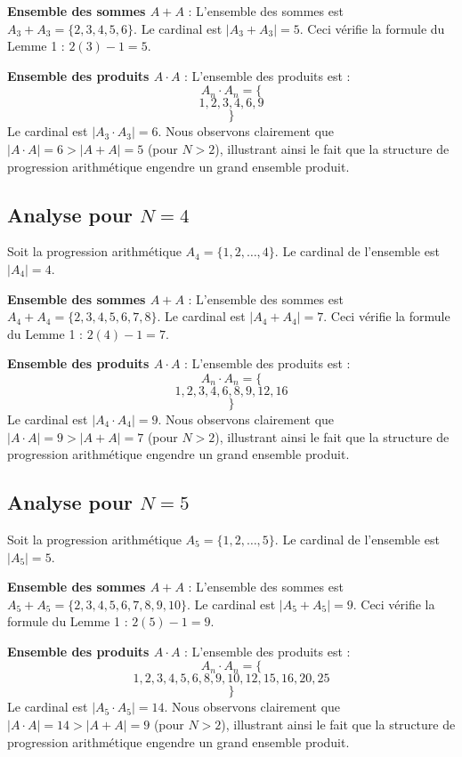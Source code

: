 \documentclass[11pt,a4paper]{article}
\begin{document}
\textbf{Ensemble des sommes $A+A$} :
L'ensemble des sommes est $A_{3} + A_{3} = \{2, 3, 4, 5, 6\} $. Le cardinal est $|A_{3} + A_{3}| = 5$. Ceci vérifie la formule du Lemme 1 : $2(3) - 1 = 5$.

\textbf{Ensemble des produits $A \cdot A$} :
L'ensemble des produits est :
$$ A_{{{n}}} \cdot A_{{{n}}} = \{ $$$$ 1, 2, 3, 4, 6, 9 $$$$ \} $$
Le cardinal est $|A_{3} \cdot A_{3}| = 6$.
Nous observons clairement que $|A \cdot A| = 6 > |A+A| = 5$ (pour $N > 2$), illustrant ainsi le fait que la structure de progression arithmétique engendre un grand ensemble produit.
\newpage

\subsection{Analyse pour $N = 4$}
Soit la progression arithmétique $A_{4} = \{1, 2, \dots, 4\} $. Le cardinal de l'ensemble est $|A_{4}| = 4$.

\textbf{Ensemble des sommes $A+A$} :
L'ensemble des sommes est $A_{4} + A_{4} = \{2, 3, 4, 5, 6, 7, 8\} $. Le cardinal est $|A_{4} + A_{4}| = 7$. Ceci vérifie la formule du Lemme 1 : $2(4) - 1 = 7$.

\textbf{Ensemble des produits $A \cdot A$} :
L'ensemble des produits est :
$$ A_{{{n}}} \cdot A_{{{n}}} = \{ $$$$ 1, 2, 3, 4, 6, 8, 9, 12, 16 $$$$ \} $$
Le cardinal est $|A_{4} \cdot A_{4}| = 9$.
Nous observons clairement que $|A \cdot A| = 9 > |A+A| = 7$ (pour $N > 2$), illustrant ainsi le fait que la structure de progression arithmétique engendre un grand ensemble produit.
\newpage

\subsection{Analyse pour $N = 5$}
Soit la progression arithmétique $A_{5} = \{1, 2, \dots, 5\} $. Le cardinal de l'ensemble est $|A_{5}| = 5$.

\textbf{Ensemble des sommes $A+A$} :
L'ensemble des sommes est $A_{5} + A_{5} = \{2, 3, 4, 5, 6, 7, 8, 9, 10\} $. Le cardinal est $|A_{5} + A_{5}| = 9$. Ceci vérifie la formule du Lemme 1 : $2(5) - 1 = 9$.

\textbf{Ensemble des produits $A \cdot A$} :
L'ensemble des produits est :
$$ A_{{{n}}} \cdot A_{{{n}}} = \{ $$$$ 1, 2, 3, 4, 5, 6, 8, 9, 10, 12, 15, 16, 20, 25 $$$$ \} $$
Le cardinal est $|A_{5} \cdot A_{5}| = 14$.
Nous observons clairement que $|A \cdot A| = 14 > |A+A| = 9$ (pour $N > 2$), illustrant ainsi le fait que la structure de progression arithmétique engendre un grand ensemble produit.
\newpage
\end{document}

